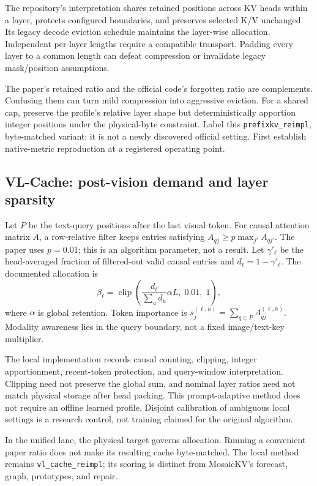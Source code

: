 The repository's interpretation shares retained positions across KV heads
within a layer, protects configured boundaries, and preserves selected K/V
unchanged. Its legacy decode eviction schedule maintains the layer-wise
allocation. Independent per-layer lengths require a compatible transport.
Padding every layer to a common length can defeat compression or invalidate
legacy mask/position assumptions.

The paper's retained ratio and the official code's forgotten ratio are
complements. Confusing them can turn mild compression into aggressive eviction.
For a shared cap, preserve the profile's relative layer shape but deterministically
apportion integer positions under the physical-byte constraint. Label this
\texttt{prefixkv\_reimpl}, byte-matched variant; it is not a newly discovered
official setting. First establish native-metric reproduction at a registered
operating point.

\subsection{VL-Cache: post-vision demand and layer sparsity}
Let $P$ be the text-query positions after the last visual token. For causal
attention matrix $A$, a row-relative filter keeps entries satisfying
$A_{qj}\ge p\max_{j'}A_{qj'}$. The paper uses $p=0.01$; this is an algorithm
parameter, not a result. Let $\gamma'_\ell$ be the head-averaged fraction of
filtered-out valid causal entries and $d_\ell=1-\gamma'_\ell$.
The documented allocation is
\begin{equation}
 \beta_\ell=\operatorname{clip}\!\left(
 \frac{d_\ell}{\sum_u d_u}\alpha L,\;0.01,\;1\right),
\end{equation}
where $\alpha$ is global retention. Token importance is
$s_j^{(\ell,h)}=\sum_{q\in P}A_{qj}^{(\ell,h)}$.
Modality awareness lies in the query boundary, not a fixed image/text-key
multiplier.

The local implementation records causal counting, clipping, integer apportionment,
recent-token protection, and query-window interpretation. Clipping need not
preserve the global sum, and nominal layer ratios need not match physical
storage after head packing. This prompt-adaptive method does not require an
offline learned profile. Disjoint calibration of ambiguous local settings is
a research control, not training claimed for the original algorithm.

In the unified lane, the physical target governs allocation. Running a
convenient paper ratio does not make its resulting cache byte-matched. The
local method remains \texttt{vl\_cache\_reimpl}; its scoring is distinct from
MosaicKV's forecast, graph, prototypes, and repair.

